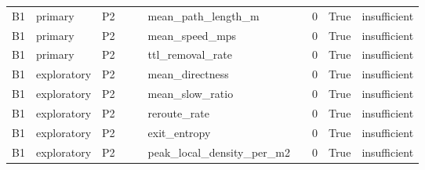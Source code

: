 \begin{tabular}{llllllllll}
B1 & primary & P2 &  &  & mean\_path\_length\_m &  & 0 & True & insufficient \\
B1 & primary & P2 &  &  & mean\_speed\_mps &  & 0 & True & insufficient \\
B1 & primary & P2 &  &  & ttl\_removal\_rate &  & 0 & True & insufficient \\
B1 & exploratory & P2 &  &  & mean\_directness &  & 0 & True & insufficient \\
B1 & exploratory & P2 &  &  & mean\_slow\_ratio &  & 0 & True & insufficient \\
B1 & exploratory & P2 &  &  & reroute\_rate &  & 0 & True & insufficient \\
B1 & exploratory & P2 &  &  & exit\_entropy &  & 0 & True & insufficient \\
B1 & exploratory & P2 &  &  & peak\_local\_density\_per\_m2 &  & 0 & True & insufficient \\
\hline
\end{tabular}

